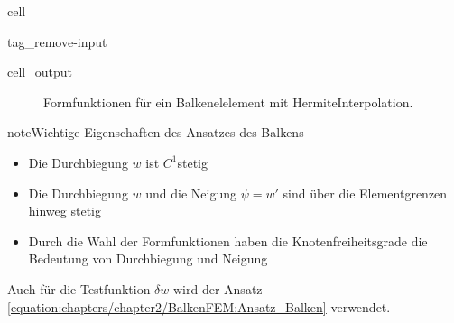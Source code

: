 \documentclass[letterpaper,10pt,german]{jupyterBook}
\begin{document}
\begin{sphinxuseclass}{cell}
\begin{sphinxuseclass}{tag_remove-input}\begin{sphinxVerbatimOutput}

\begin{sphinxuseclass}{cell_output}
\begin{figure}[htbp]
\centering
\capstart

\noindent{}
\caption{Formfunktionen für ein Balkenelelement mit Hermite\sphinxhyphen{}Interpolation.}\label{\detokenize{chapters/chapter2/BalkenFEM:shape-beam}}\end{figure}

\end{sphinxuseclass}\end{sphinxVerbatimOutput}

\end{sphinxuseclass}
\end{sphinxuseclass}
\begin{sphinxadmonition}{note}{Wichtige Eigenschaften des Ansatzes des Balkens}
\begin{itemize}
\item {} 
\sphinxAtStartPar
Die Durchbiegung \(w\) ist \(C^1\)\sphinxhyphen{}stetig

\item {} 
\sphinxAtStartPar
Die Durchbiegung \(w\) und die Neigung \(\psi=w'\) sind über die Elementgrenzen hinweg stetig

\item {} 
\sphinxAtStartPar
Durch die Wahl der Formfunktionen haben die Knotenfreiheitsgrade die Bedeutung von Durchbiegung und Neigung

\end{itemize}
\end{sphinxadmonition}

\sphinxAtStartPar
Auch für die Testfunktion \(\delta w\) wird der Ansatz \eqref{equation:chapters/chapter2/BalkenFEM:Ansatz_Balken} verwendet.
\end{document}
